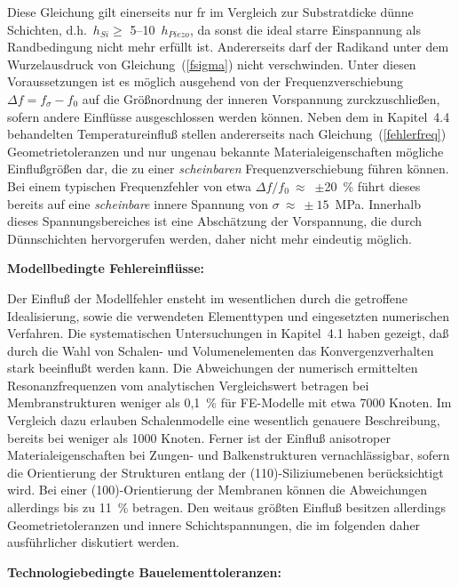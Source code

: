 Diese Gleichung gilt einerseits nur fr im Vergleich zur Substratdicke dünne
Schichten, d.h.\ $h_{Si}\geq$ 5--10~$h_{Piezo}$, da sonst die ideal starre
Einspannung als Randbedingung nicht mehr erfüllt ist. Andererseits darf der
Radikand unter dem Wurzelausdruck von Gleichung~(\ref{fsigma}) nicht
verschwinden. Unter diesen Voraussetzungen ist es möglich ausgehend von der
Frequenzverschiebung $\Delta f = f_{\sigma} - f_{0}$ auf die Größnordnung
der inneren Vorspannung zurckzuschließen, sofern andere Einflüsse
ausgeschlossen werden
können. Neben dem in Kapitel~4.4 behandelten Temperatureinfluß stellen
andererseits nach Gleichung~(\ref{fehlerfreq}) Geometrietoleranzen und nur
ungenau bekannte Materialeigenschaften mögliche Einflußgrößen dar, die zu
einer {\em scheinbaren} Frequenzverschiebung führen können. Bei einem
typischen Frequenzfehler von etwa $\Delta f/f_{0}~\approx$~$\pm$20~\% führt
dieses bereits auf eine {\em scheinbare} innere Spannung von
$\sigma~\approx~\pm15$~MPa. Innerhalb dieses Spannungsbereiches ist eine
Abschätzung der Vorspannung, die durch Dünnschichten hervorgerufen werden,
daher nicht mehr eindeutig möglich.


\newpage
{\bf Modellbedingte Fehlereinflüsse:}

Der Einfluß der Modellfehler ensteht im wesentlichen durch die getroffene
Idealisierung, sowie die verwendeten Elementtypen und eingesetzten
numerischen Verfahren. Die systematischen Untersuchungen in Kapitel~4.1
haben gezeigt, daß durch die Wahl von Schalen- und Volumenelementen das
Konvergenzverhalten stark beeinflußt werden kann. Die Abweichungen der
numerisch ermittelten Resonanzfrequenzen vom analytischen Vergleichswert
betragen bei Membranstrukturen weniger als 0,1~\% für FE-Modelle mit etwa
7000 Knoten. Im Vergleich dazu erlauben Schalenmodelle eine wesentlich
genauere Beschreibung, bereits bei weniger als 1000 Knoten.
Ferner ist der Einfluß anisotroper
Materialeigenschaften bei Zungen- und Balkenstrukturen vernachlässigbar,
sofern die Orientierung der Strukturen entlang der (110)-Siliziumebenen
berücksichtigt wird. Bei einer (100)-Orientierung der Membranen können
die Abweichungen allerdings bis zu 11~\% betragen. Den weitaus größten
Einfluß besitzen allerdings Geometrietoleranzen und innere
Schichtspannungen, die im folgenden daher ausführlicher diskutiert werden.


{\bf Technologiebedingte Bauelementtoleranzen:}

